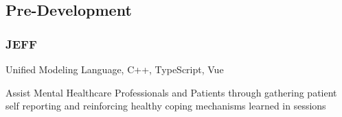 \documentclass[10pt]{article} %
\begin{document}

\subsection{Pre-Development}
\subsubsection{JEFF}
\begin{description}[style=multiline, leftmargin=2.75cm]
    \item[Technologies] {Unified Modeling Language, C++, TypeScript, Vue}
    \item[Purpose] {Assist Mental Healthcare Professionals and Patients 
        through gathering patient \\ self reporting and reinforcing healthy 
        coping mechanisms learned in sessions}  
\end{description}
\end{document}
